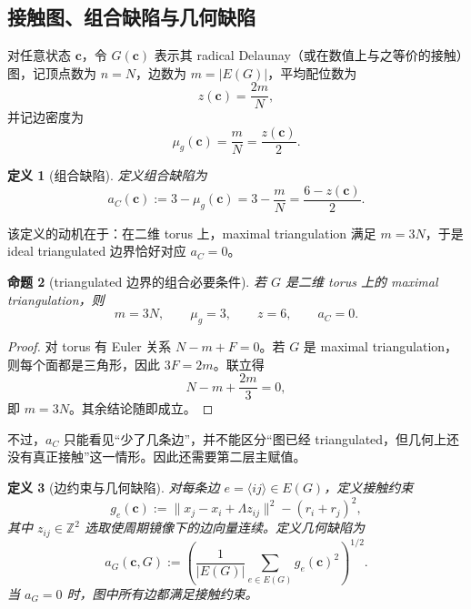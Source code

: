 \documentclass[12pt]{ctexart}
\newtheorem{definition}{定义}[section]
\newtheorem{proposition}[definition]{命题}
\begin{document}
\subsection{接触图、组合缺陷与几何缺陷}

对任意状态 $\mathbf{c}$，令 $G(\mathbf{c})$ 表示其 radical Delaunay（或在数值上与之等价的接触）图，记顶点数为 $n=N$，边数为 $m=|E(G)|$，平均配位数为
\begin{equation}
 z(\mathbf{c}) = \frac{2m}{N},
\end{equation}
并记边密度为
\begin{equation}
 \mu_g(\mathbf{c}) = \frac{m}{N} = \frac{z(\mathbf{c})}{2}.
\end{equation}

\begin{definition}[组合缺陷]
定义组合缺陷为
\begin{equation}
 a_C(\mathbf{c}) := 3 - \mu_g(\mathbf{c}) = 3 - \frac{m}{N} = \frac{6-z(\mathbf{c})}{2}.
\end{equation}
\end{definition}

该定义的动机在于：在二维 torus 上，maximal triangulation 满足 $m=3N$，于是 ideal triangulated 边界恰好对应 $a_C=0$。

\begin{proposition}[triangulated 边界的组合必要条件]
若 $G$ 是二维 torus 上的 maximal triangulation，则
\begin{equation}
 m = 3N,\qquad \mu_g = 3,\qquad z=6,\qquad a_C=0.
\end{equation}
\end{proposition}

\begin{proof}
对 torus 有 Euler 关系 $N-m+F=0$。若 $G$ 是 maximal triangulation，则每个面都是三角形，因此 $3F=2m$。联立得
\begin{equation}
N-m+\frac{2m}{3}=0,
\end{equation}
即 $m=3N$。其余结论随即成立。
\end{proof}

不过，$a_C$ 只能看见“少了几条边”，并不能区分“图已经 triangulated，但几何上还没有真正接触”这一情形。因此还需要第二层主赋值。

\begin{definition}[边约束与几何缺陷]
对每条边 $e=\langle ij\rangle \in E(G)$，定义接触约束
\begin{equation}
 g_e(\mathbf{c}) := \|x_j-x_i+\Lambda z_{ij}\|^2-(r_i+r_j)^2,
\end{equation}
其中 $z_{ij}\in\mathbb{Z}^2$ 选取使周期镜像下的边向量连续。定义几何缺陷为
\begin{equation}
 a_G(\mathbf{c},G) := \left(\frac{1}{|E(G)|}\sum_{e\in E(G)} g_e(\mathbf{c})^2\right)^{1/2}.
\end{equation}
当 $a_G=0$ 时，图中所有边都满足接触约束。
\end{definition}
\end{document}
